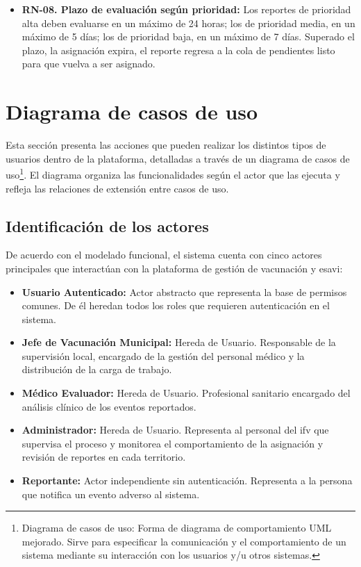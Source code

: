 \begin{itemize}
    \item \textbf{RN-08. Plazo de evaluación según prioridad:} Los reportes de prioridad alta deben evaluarse en un máximo de 24 horas; los de prioridad media, en un máximo de 5 días; los de prioridad baja, en un máximo de 7 días. 
    Superado el plazo, la asignación expira, el reporte regresa a la cola de pendientes listo para que vuelva a ser asignado.

\end{itemize}


\section{Diagrama de casos de uso}

Esta sección presenta las acciones que pueden realizar los distintos tipos de usuarios dentro de la plataforma, detalladas a través de un diagrama de casos de uso\footnote{Diagrama de casos de uso: Forma de diagrama de comportamiento UML mejorado. Sirve para especificar la comunicación y el comportamiento de un sistema mediante su interacción con los usuarios y/u otros sistemas.}. 
El diagrama organiza las funcionalidades según el actor que las ejecuta y refleja las relaciones de extensión entre casos de uso.

\subsection{Identificación de los actores}

De acuerdo con el modelado funcional, el sistema cuenta con cinco actores principales que interactúan con la plataforma de gestión de vacunación y \gls{esavi}:

\begin{itemize}
    \item \textbf{Usuario Autenticado:} Actor abstracto que representa la base de permisos comunes. De él heredan todos los roles que requieren autenticación en el sistema.
    \item \textbf{Jefe de Vacunación Municipal:} Hereda de Usuario. Responsable de la supervisión local, encargado de la gestión del personal médico y la distribución de la carga de trabajo.
    \item \textbf{Médico Evaluador:} Hereda de Usuario. Profesional sanitario encargado del análisis clínico de los eventos reportados.
    \item \textbf{Administrador:} Hereda de Usuario. Representa al personal del \gls{ifv} que supervisa el proceso y monitorea el comportamiento de la asignación y revisión de reportes en cada territorio.
    \item \textbf{Reportante:} Actor independiente sin autenticación. Representa a la persona que notifica un evento adverso al sistema.
\end{itemize}

